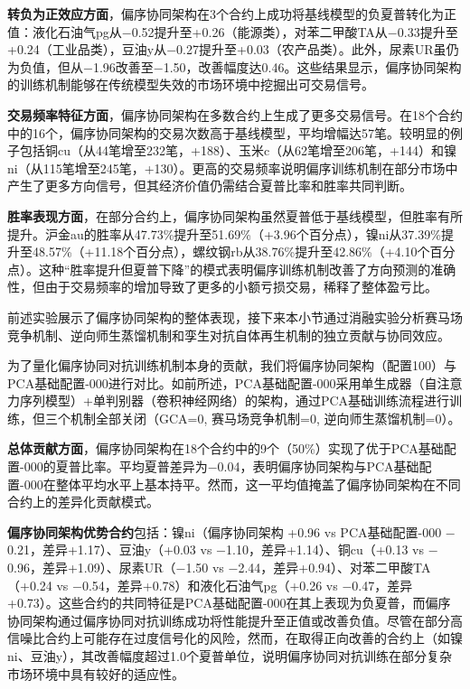 \textbf{转负为正效应方面}，偏序协同架构在3个合约上成功将基线模型的负夏普转化为正值：液化石油气pg从$-$0.52提升至+0.26（能源类），对苯二甲酸TA从$-$0.33提升至+0.24（工业品类），豆油y从$-$0.27提升至+0.03（农产品类）。此外，尿素UR虽仍为负值，但从$-$1.96改善至$-$1.50，改善幅度达0.46。这些结果显示，偏序协同架构的训练机制能够在传统模型失效的市场环境中挖掘出可交易信号。

\textbf{交易频率特征方面}，偏序协同架构在多数合约上生成了更多交易信号。在18个合约中的16个，偏序协同架构的交易次数高于基线模型，平均增幅达57笔。较明显的例子包括铜cu（从44笔增至232笔，+188）、玉米c（从62笔增至206笔，+144）和镍ni（从115笔增至245笔，+130）。更高的交易频率说明偏序训练机制在部分市场中产生了更多方向信号，但其经济价值仍需结合夏普比率和胜率共同判断。

\textbf{胜率表现方面}，在部分合约上，偏序协同架构虽然夏普低于基线模型，但胜率有所提升。沪金au的胜率从47.73\%提升至51.69\%（+3.96个百分点），镍ni从37.39\%提升至48.57\%（+11.18个百分点），螺纹钢rb从38.76\%提升至42.86\%（+4.10个百分点）。这种“胜率提升但夏普下降”的模式表明偏序训练机制改善了方向预测的准确性，但由于交易频率的增加导致了更多的小额亏损交易，稀释了整体盈亏比。

% 


前述实验展示了偏序协同架构的整体表现，接下来本小节通过消融实验分析赛马场竞争机制、逆向师生蒸馏机制和孪生对抗自体再生机制的独立贡献与协同效应。

为了量化偏序协同对抗训练机制本身的贡献，我们将偏序协同架构（配置100）与PCA基础配置-000进行对比。如前所述，PCA基础配置-000采用单生成器（自注意力序列模型）+单判别器（卷积神经网络）的架构，通过PCA基础训练流程进行训练，但三个机制全部关闭（GCA=0, 赛马场竞争机制=0, 逆向师生蒸馏机制=0）。

\textbf{总体贡献方面}，偏序协同架构在18个合约中的9个（50\%）实现了优于PCA基础配置-000的夏普比率。平均夏普差异为$-$0.04，表明偏序协同架构与PCA基础配置-000在整体平均水平上基本持平。然而，这一平均值掩盖了偏序协同架构在不同合约上的差异化贡献模式。

\textbf{偏序协同架构优势合约}包括：镍ni（偏序协同架构 +0.96 vs PCA基础配置-000 $-$0.21，差异+1.17）、豆油y（+0.03 vs $-$1.10，差异+1.14）、铜cu（+0.13 vs $-$0.96，差异+1.09）、尿素UR（$-$1.50 vs $-$2.44，差异+0.94）、对苯二甲酸TA（+0.24 vs $-$0.54，差异+0.78）和液化石油气pg（+0.26 vs $-$0.47，差异+0.73）。这些合约的共同特征是PCA基础配置-000在其上表现为负夏普，而偏序协同架构通过偏序协同对抗训练成功将性能提升至正值或改善负值。尽管在部分高信噪比合约上可能存在过度信号化的风险，然而，在取得正向改善的合约上（如镍ni、豆油y），其改善幅度超过1.0个夏普单位，说明偏序协同对抗训练在部分复杂市场环境中具有较好的适应性。

